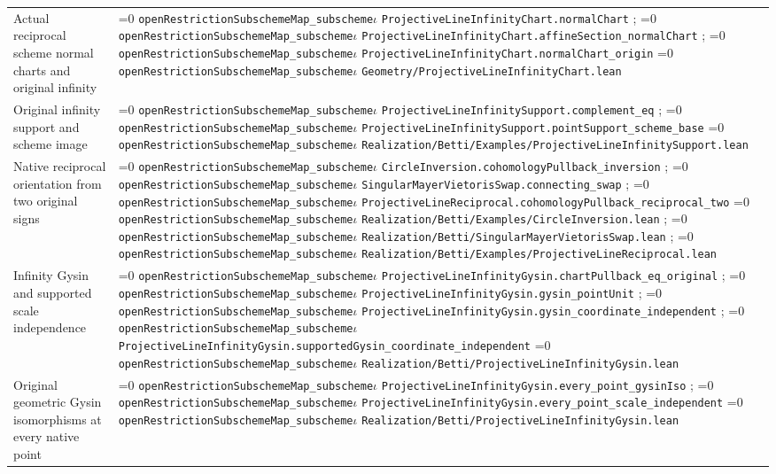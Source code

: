 \documentclass[11pt]{article}
\theoremstyle{definition}
\theoremstyle{remark}
\newcommand{\leanpath}[1]{%
  \ifnum\pdfstrcmp{\detokenize{#1}}%
      {\detokenize{openRestrictionSubschemeMap_subschemeι}}=0
    \texttt{\nolinkurl{openRestrictionSubschemeMap_subscheme}}\ensuremath{\iota}%
  \else
    \texttt{\nolinkurl{#1}}%
  \fi}
\begin{document}
\begin{longtable}{@{}>{\raggedright\arraybackslash}p{}
                >{\raggedright\arraybackslash}p{}@{}}
Actual reciprocal scheme normal charts and original infinity &
\leanpath{ProjectiveLineInfinityChart.normalChart};\newline
\leanpath{ProjectiveLineInfinityChart.affineSection_normalChart};\newline
\leanpath{ProjectiveLineInfinityChart.normalChart_origin}\newline
\leanpath{Geometry/ProjectiveLineInfinityChart.lean}\\
Original infinity support and scheme image &
\leanpath{ProjectiveLineInfinitySupport.complement_eq};\newline
\leanpath{ProjectiveLineInfinitySupport.pointSupport_scheme_base}\newline
{\footnotesize\leanpath{Realization/Betti/Examples/ProjectiveLineInfinitySupport.lean}}\\
Native reciprocal orientation from two original signs &
\leanpath{CircleInversion.cohomologyPullback_inversion};\newline
\leanpath{SingularMayerVietorisSwap.connecting_swap};\newline
{\footnotesize\leanpath{ProjectiveLineReciprocal.cohomologyPullback_reciprocal_two}}\newline
\leanpath{Realization/Betti/Examples/CircleInversion.lean};\newline
\leanpath{Realization/Betti/SingularMayerVietorisSwap.lean};\newline
\leanpath{Realization/Betti/Examples/ProjectiveLineReciprocal.lean}\\
Infinity Gysin and supported scale independence &
\leanpath{ProjectiveLineInfinityGysin.chartPullback_eq_original};\newline
\leanpath{ProjectiveLineInfinityGysin.gysin_pointUnit};\newline
\leanpath{ProjectiveLineInfinityGysin.gysin_coordinate_independent};\newline
{\footnotesize\leanpath{ProjectiveLineInfinityGysin.supportedGysin_coordinate_independent}}\newline
\leanpath{Realization/Betti/ProjectiveLineInfinityGysin.lean}\\
Original geometric Gysin isomorphisms at every native point &
\leanpath{ProjectiveLineInfinityGysin.every_point_gysinIso};\newline
\leanpath{ProjectiveLineInfinityGysin.every_point_scale_independent}\newline
\leanpath{Realization/Betti/ProjectiveLineInfinityGysin.lean}\\

\end{longtable}
\end{document}
